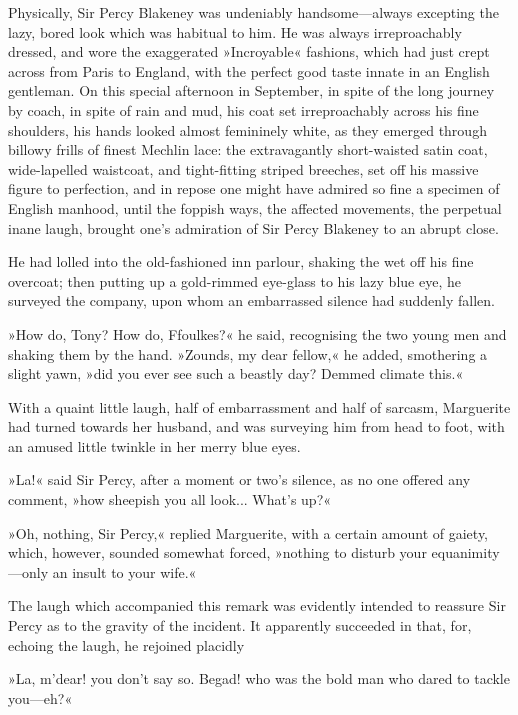 Physically, Sir Percy Blakeney was undeniably  handsome\allowbreak---\allowbreak always excepting the lazy, bored look which was habitual to him. He was always irreproachably dressed, and wore the exaggerated »Incroyable« fashions, which had just crept across from Paris to England, with the perfect good taste innate in an English gentleman. On this special afternoon in September, in spite of the long journey by coach, in spite of rain and mud, his coat set irreproachably across his fine shoulders, his hands looked almost femininely white, as they emerged through billowy frills of finest Mechlin lace: the extravagantly short-waisted satin coat, wide-lapelled waistcoat, and tight-fitting striped breeches, set off his massive figure to perfection, and in repose one might have admired so fine a specimen of English manhood, until the foppish ways, the affected movements, the perpetual inane laugh, brought one's admiration of Sir Percy Blakeney to an abrupt close.

He had lolled into the old-fashioned inn parlour, shaking the wet off his fine overcoat; then putting up a gold-rimmed eye-glass to his lazy blue eye, he surveyed the company, upon whom an embarrassed silence had suddenly fallen.

»How do, Tony? How do, Ffoulkes?« he said, recognising the two young men and shaking them by the hand. »Zounds, my dear fellow,« he added, smothering a slight yawn, »did you ever see such a beastly day? Demmed climate this.«

With a quaint little laugh, half of embarrassment and half of sarcasm, Marguerite had turned towards her husband, and was surveying him from head to foot, with an amused little twinkle in her merry blue eyes.

»La!« said Sir Percy, after a moment or two's silence, as no one offered any comment, »how sheepish you all look... What's up?«

»Oh, nothing, Sir Percy,« replied Marguerite, with a certain amount of gaiety, which, however, sounded somewhat forced, »nothing to disturb your equanimity\allowbreak---\allowbreak only an insult to your wife.«

The laugh which accompanied this remark was evidently intended to reassure Sir Percy as to the gravity of the incident. It apparently succeeded in that, for, echoing the laugh, he rejoined placidly\longdash


»La, m'dear! you don't say so. Begad! who was the bold man who dared to tackle you\allowbreak---\allowbreak eh?«

